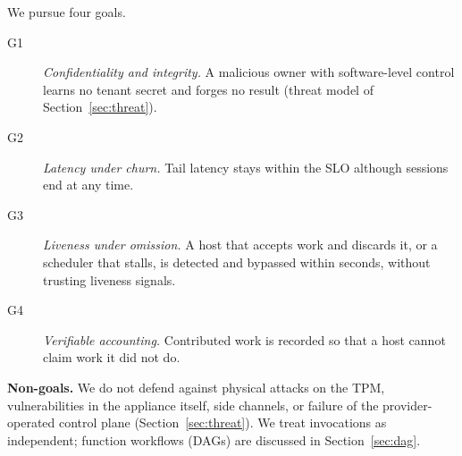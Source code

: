 We pursue four goals.
\begin{description}
\item[G1] \emph{Confidentiality and integrity.} A malicious owner with software-level control learns no tenant secret and forges no result (threat model of Section~\ref{sec:threat}).
\item[G2] \emph{Latency under churn.} Tail latency stays within the SLO although sessions end at any time.
\item[G3] \emph{Liveness under omission.} A host that accepts work and discards it, or a scheduler that stalls, is detected and
bypassed within seconds, without trusting liveness signals.
\item[G4] \emph{Verifiable accounting.} Contributed work is recorded so that a host cannot claim work it did not do.
\end{description}
\textbf{Non-goals.} We do not defend against physical attacks on the TPM, vulnerabilities in the appliance
itself, side channels, or failure of the provider-operated control plane (Section~\ref{sec:threat}). We treat invocations as independent; function workflows (DAGs) are discussed in Section~\ref{sec:dag}.
